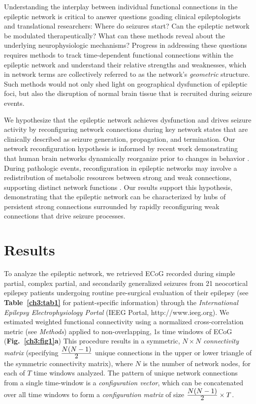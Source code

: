 Understanding the interplay between individual functional connections in the epileptic network is critical to answer questions goading clinical epileptologists and translational researchers: Where do seizures start? Can the epileptic network be modulated therapeutically? What can these methods reveal about the underlying neurophysiologic mechanisms? Progress in addressing these questions requires methods to track time-dependent functional connections within the epileptic network and understand their relative strengths and weaknesses, which in network terms are collectively referred to as the network's \emph{geometric} structure. Such methods would not only shed light on geographical dysfunction of epileptic foci, but also the disruption of normal brain tissue that is recruited during seizure events.

We hypothesize that the epileptic network achieves dysfunction and drives seizure activity by reconfiguring network connections during key network states that are clinically described as seizure generation, propagation, and termination. Our network reconfiguration hypothesis is informed by recent work demonstrating that human brain networks dynamically reorganize prior to changes in behavior \cite{bassett2011dynamic, ekman2012predicting}. During pathologic events, reconfiguration in epileptic networks may involve a redistribution of metabolic resources between strong and weak connections, supporting distinct network functions \cite{ercsey-ravasz2013predictive, santarnecchi2014efficiency}. Our results support this hypothesis, demonstrating that the epileptic network can be characterized by hubs of persistent strong connections surrounded by rapidly reconfiguring weak connections that drive seizure processes.

\section{Results}
To analyze the epileptic network, we retrieved ECoG recorded during simple partial, complex partial, and secondarily generalized seizures from 21 neocortical epilepsy patients undergoing routine pre-surgical evaluation of their epilepsy (see \textbf{Table~{\ref{ch3:tab1}}} for patient-specific information) through the \textit{International Epilepsy Electrophysiology Portal} (IEEG Portal, http://www.ieeg.org). We estimated weighted functional connectivity using a normalized cross-correlation metric (see \textit{Methods}) applied to non-overlapping, 1s time windows of ECoG (\textbf{Fig.~\ref{ch3:fig1}a}) This procedure results in a symmetric, $N \times N$ \textit{connectivity matrix} (specifying $\frac{\displaystyle N(N-1)}{\displaystyle 2}$ unique connections in the upper or lower triangle of the symmetric connectivity matrix), where $N$ is the number of network nodes, for each of $T$ time windows analyzed. The pattern of unique network connections from a single time-window is a \textit{configuration vector}, which can be concatenated over all time windows to form a \textit{configuration matrix} of size $\frac{\displaystyle N(N-1)}{\displaystyle 2} \times T$.

